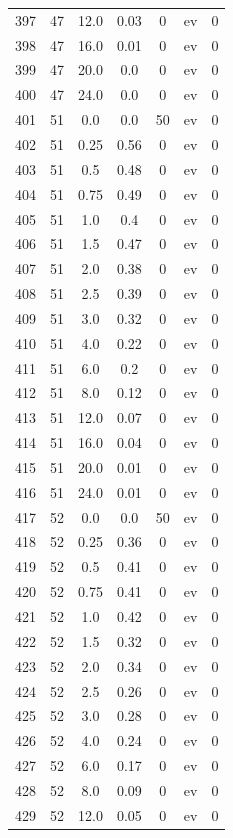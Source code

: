 \documentclass[12pt,a4paper]{article}
\begin{document}
\begin{tabular}{r|cccccc}
	397 & 47 & 12.0 & 0.03 & 0 & ev & 0 \\
	398 & 47 & 16.0 & 0.01 & 0 & ev & 0 \\
	399 & 47 & 20.0 & 0.0 & 0 & ev & 0 \\
	400 & 47 & 24.0 & 0.0 & 0 & ev & 0 \\
	401 & 51 & 0.0 & 0.0 & 50 & ev & 0 \\
	402 & 51 & 0.25 & 0.56 & 0 & ev & 0 \\
	403 & 51 & 0.5 & 0.48 & 0 & ev & 0 \\
	404 & 51 & 0.75 & 0.49 & 0 & ev & 0 \\
	405 & 51 & 1.0 & 0.4 & 0 & ev & 0 \\
	406 & 51 & 1.5 & 0.47 & 0 & ev & 0 \\
	407 & 51 & 2.0 & 0.38 & 0 & ev & 0 \\
	408 & 51 & 2.5 & 0.39 & 0 & ev & 0 \\
	409 & 51 & 3.0 & 0.32 & 0 & ev & 0 \\
	410 & 51 & 4.0 & 0.22 & 0 & ev & 0 \\
	411 & 51 & 6.0 & 0.2 & 0 & ev & 0 \\
	412 & 51 & 8.0 & 0.12 & 0 & ev & 0 \\
	413 & 51 & 12.0 & 0.07 & 0 & ev & 0 \\
	414 & 51 & 16.0 & 0.04 & 0 & ev & 0 \\
	415 & 51 & 20.0 & 0.01 & 0 & ev & 0 \\
	416 & 51 & 24.0 & 0.01 & 0 & ev & 0 \\
	417 & 52 & 0.0 & 0.0 & 50 & ev & 0 \\
	418 & 52 & 0.25 & 0.36 & 0 & ev & 0 \\
	419 & 52 & 0.5 & 0.41 & 0 & ev & 0 \\
	420 & 52 & 0.75 & 0.41 & 0 & ev & 0 \\
	421 & 52 & 1.0 & 0.42 & 0 & ev & 0 \\
	422 & 52 & 1.5 & 0.32 & 0 & ev & 0 \\
	423 & 52 & 2.0 & 0.34 & 0 & ev & 0 \\
	424 & 52 & 2.5 & 0.26 & 0 & ev & 0 \\
	425 & 52 & 3.0 & 0.28 & 0 & ev & 0 \\
	426 & 52 & 4.0 & 0.24 & 0 & ev & 0 \\
	427 & 52 & 6.0 & 0.17 & 0 & ev & 0 \\
	428 & 52 & 8.0 & 0.09 & 0 & ev & 0 \\
	429 & 52 & 12.0 & 0.05 & 0 & ev & 0 \\

\end{tabular}
\end{document}
